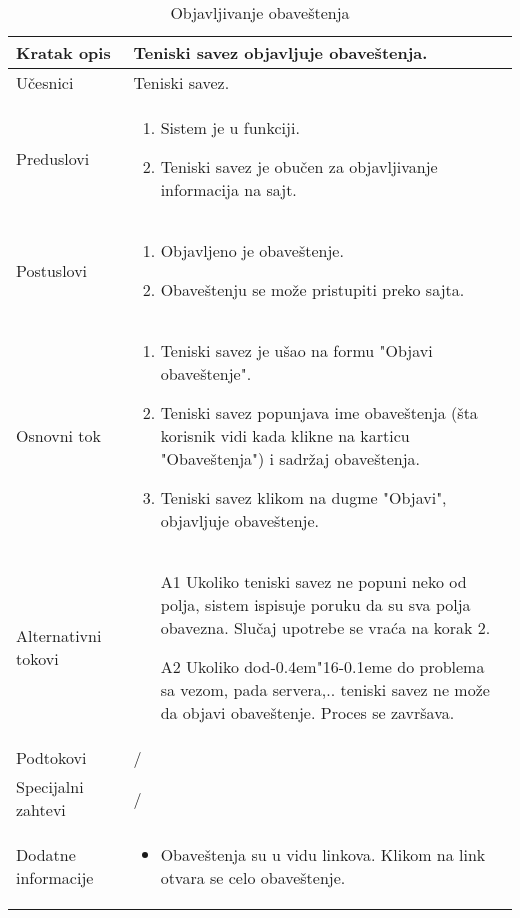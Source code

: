 \documentclass{article}
\begin{document}
\def \dj{d\kern-0.4em\char"16\kern-0.1em}
\def \Dj{\mbox{\raise0.3ex\hbox{-}\kern-0.4em D}}
\begin{longtable}{| p{} | p{} |} 
\hline
    Kratak opis & Teniski savez objavljuje obave\v{s}tenja.\\ 
\hline    
    U\v{c}esnici & Teniski savez.
    \\
\hline
   Preduslovi & \begin{enumerate}
       \item Sistem je u funkciji.
       \item Teniski savez je obu\v{c}en za objavljivanje informacija na sajt.
   \end{enumerate}\\
\hline  
    Postuslovi & \begin{enumerate}
        \item Objavljeno je obave\v{s}tenje.
        \item Obave\v{s}tenju se mo\v{z}e pristupiti preko sajta.
    \end{enumerate}\\
\hline
    Osnovni tok & \begin{enumerate}
        \item Teniski savez je u\v{s}ao na formu "Objavi obave\v{s}tenje".
        \item Teniski savez popunjava ime obave\v{s}tenja (\v{s}ta korisnik vidi kada klikne na karticu "Obave\v{s}tenja") i sadr\v{z}aj obave\v{s}tenja.
        \item Teniski savez klikom na dugme "Objavi", objavljuje obave\v{s}tenje.
    \end{enumerate}\\
\hline
    Alternativni tokovi & \begin{itemize}
        \item[A1] Ukoliko teniski savez ne popuni neko od polja, sistem ispisuje poruku da su sva polja obavezna. Slu\v{c}aj upotrebe se vra\'{c}a na korak 2.
        \item[A2] Ukoliko do\dj{}e do problema sa vezom, pada servera,.. teniski savez ne mo\v{z}e da objavi obave\v{s}tenje. Proces se zavr\v{s}ava.
    \end{itemize}\\
\hline
    Podtokovi & /\\
\hline
    Specijalni zahtevi & /\\
\hline
    Dodatne informacije & \begin{itemize}
        \item Obave\v{s}tenja su u vidu linkova. Klikom na link otvara se celo obave\v{s}tenje.
    \end{itemize}
\hline
\caption{Objavljivanje obave\v{s}tenja} %
\end{longtable}


\end{document}
